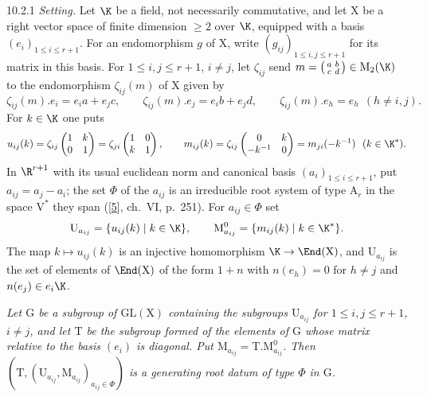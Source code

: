 \documentclass[12pt,a4paper,oneside,english]{smfart}
\makeatletter
\newcommand{\btanchor}[1]{\leavevmode\Hy@raisedlink{\hypertarget{bt:#1}{}}}
\newcommand{\btbib}[1]{\hyperlink{bib:#1}{#1}}
\theoremstyle{definition}
\theoremstyle{bt}
\makeatother
\begin{document}
\num{10.2.1}\btanchor{10.2.1} \emph{Setting.} Let $\K$ be a field, not necessarily commutative,
and let $\mathrm{X}$ be a right vector space of finite dimension $\geqslant 2$
over $\K$, equipped with a basis $(e_i)_{1\leqslant i\leqslant r+1}$. For an
endomorphism $g$ of $\mathrm{X}$, write $(g_{ij})_{1\leqslant i,j\leqslant r+1}$
for its matrix in this basis. For $1\leqslant i,j\leqslant r+1$, $i\neq j$, let
$\zeta_{ij}$ send $m=\left(\begin{smallmatrix}a&b\\c&d\end{smallmatrix}\right)\in
\mathrm{M}_2(\K)$ to the endomorphism $\zeta_{ij}(m)$ of $\mathrm{X}$ given by
\[
\zeta_{ij}(m).e_i=e_i a+e_j c,\qquad
\zeta_{ij}(m).e_j=e_i b+e_j d,\qquad
\zeta_{ij}(m).e_h=e_h\ \ (h\neq i,j).
\]
For $k\in\K$ one puts
\[
u_{ij}(k)=\zeta_{ij}\begin{pmatrix}1&k\\0&1\end{pmatrix} =\zeta_{ji}\begin{pmatrix}1&0\\k&1\end{pmatrix},
\qquad
m_{ij}(k)=\zeta_{ij}\begin{pmatrix}0&k\\-k^{-1}&0\end{pmatrix}=m_{ji}(-k^{-1})
\ \ (k\in\K^{*}).
\]
In $\R^{r+1}$ with its usual euclidean norm and canonical basis
$(a_i)_{1\leqslant i\leqslant r+1}$, put $a_{ij}=a_j-a_i$; the set $\Phi$ of the
$a_{ij}$ is an irreducible root system of type $\mathrm{A}_r$ in the space
$\mathrm{V}^{*}$ they span ([\btbib{5}], ch.~VI, p.~251). For $a_{ij}\in\Phi$ set
\[
\mathrm{U}_{a_{ij}}=\{u_{ij}(k)\mid k\in\K\},\qquad
\mathrm{M}^{0}_{a_{ij}}=\{m_{ij}(k)\mid k\in\K^{*}\}.
\]
The map $k\mapsto u_{ij}(k)$ is an injective homomorphism $\K\to\End(\mathrm{X})$,
and $\mathrm{U}_{a_{ij}}$ is the set of elements of $\End(\mathrm{X})$ of the
form $1+n$ with $n(e_h)=0$ for $h\neq j$ and $n(e_j)\in e_i\K$.

\btanchor{10.2.2}
\emph{Let $\mathrm{G}$ be a subgroup of $\mathrm{GL}(\mathrm{X})$ containing the
subgroups $\mathrm{U}_{a_{ij}}$ for $1\leqslant i,j\leqslant r+1$, $i\neq j$,
and let $\mathrm{T}$ be the subgroup formed of the elements of $\mathrm{G}$
whose matrix relative to the basis $(e_i)$ is diagonal. Put
$\mathrm{M}_{a_{ij}}=\mathrm{T}.\mathrm{M}^{0}_{a_{ij}}$. Then
$(\mathrm{T},(\mathrm{U}_{a_{ij}},\mathrm{M}_{a_{ij}})_{a_{ij}\in\Phi})$ is a
generating root datum of type $\Phi$ in $\mathrm{G}$.}
\end{document}
